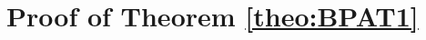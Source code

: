 \documentclass[preprint,12pt,authoryear]{elsarticle}
\begin{document}


 







\appendix
\section{Proof of Theorem \ref{theo:BPAT1}}\label{app:thm1}
\end{document}
